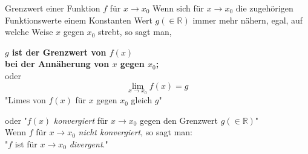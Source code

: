 \documentclass[a6paper,12pt,print,grid=none,parskip=half]{kartei}
\begin{document}
\newcommand{\limes}[2]{\lim_{#1 \rightarrow #2}}

\newcommand{\elementarlimes}[5]{
\begin{karte}{\[ \limes{x}{#1} #2 \]}
	\begin{huge}
	\[ \limes{x}{#1} #2 = #3 \]
	\end{huge}
	\begin{center}
	symbolische Kurzform: $"#4" = #3$
	\end{center}
	#5
	\end{karte}	
}

\newcommand{\kurzfrage}[3]{
\begin{karte}{\[#1\]}
	\begin{huge}\[#1 = #2\]\end{huge}
	\begin{center}#3\end{center}
	\end{karte}	
}



\begin{karte}{Grenzwert einer Funktion $f$ für $x \rightarrow x_0 $ }
Wenn sich für $x \rightarrow x_0 $ die zugehörigen Funktionswerte 
einem Konstanten Wert $g (\in \mathbb{R})$ immer mehr nähern, 
egal, auf welche Weise $x$ gegen $x_0$ strebt, so sagt man,\\
\begin{center}
\textbf{$g$ ist der Grenzwert von $f(x)$ \\bei der Annäherung von $x$ gegen $x_0$;}\\
oder 
\[\lim_{x \rightarrow x_0} f(x) = g\]
"Limes von $f(x)$ für $x$ gegen $x_0$ gleich $g$" \\
\end{center}
oder
"$f(x)$ \textit{konvergiert} für $x \rightarrow x_0$ gegen den Grenzwert $g (\in \mathbb{R})$"\\

Wenn $f$ für  $x \rightarrow x_0 $ \textit{nicht konvergiert}, so sagt man:\\
"$f$ ist für $x \rightarrow x_0 $ \textit{divergent}."
\end{karte}
\end{document}
